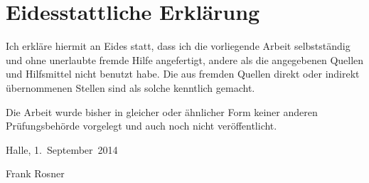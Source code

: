 \renewcommand{\baselinestretch}{1.4}\normalsize

\section*{Eidesstattliche Erklärung}

Ich erkläre hiermit an Eides statt, dass ich die vorliegende Arbeit selbstständig und ohne unerlaubte fremde Hilfe angefertigt, andere als die angegebenen Quellen und Hilfsmittel nicht benutzt habe. Die aus fremden Quellen direkt oder indirekt übernommenen Stellen sind als solche kenntlich gemacht.

Die Arbeit wurde bisher in gleicher oder ähnlicher Form keiner anderen Prüfungsbehörde vorgelegt und auch noch nicht veröffentlicht.


\vspace*{2em}
Halle, 1.~September~2014

\vspace*{2em}

Frank Rosner

\thispagestyle{empty}